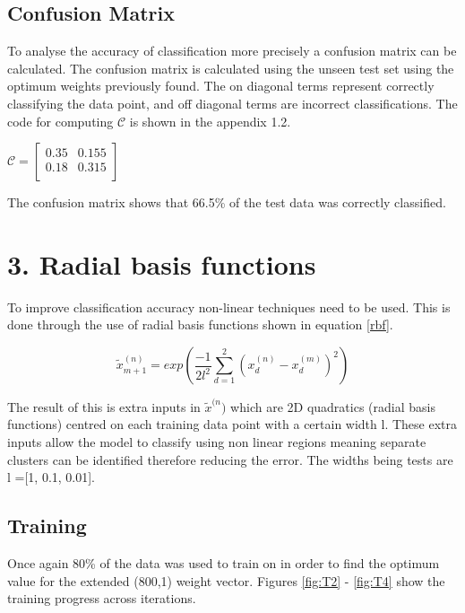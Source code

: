 \documentclass[twoside,twocolumn]{article}
\begin{document}
\subsection{Confusion Matrix}
To analyse the accuracy of classification more precisely a confusion matrix can be calculated. The confusion matrix is calculated using the unseen test set using the optimum weights previously found. The on diagonal terms represent correctly classifying the data point, and off diagonal terms are incorrect classifications. The code for computing $\mathcal{C}$ is shown in the appendix 1.2.

\begin{center}
$\mathcal{C}=  
\begin{bmatrix}
    0.35 & 0.155  \\
    0.18 & 0.315 \\
\end{bmatrix}$

\end{center}

The confusion matrix shows that 66.5\% of the test data was correctly classified.


\section{3. Radial basis functions}
To improve classification accuracy non-linear techniques need to be used. This is done through the use of radial basis functions shown in equation \ref{rbf}.

\begin{equation}
\label{rbf}
\tilde{x}_{m+1}^{(n)} = exp (\frac{-1}{2l^2}\sum^2_{d=1} (x_d^{(n)} - x_d^{(m)})^2)
\end{equation}

 The result of this is extra inputs in $\tilde{x}^{(n})$ which are 2D quadratics (radial basis functions) centred on each training data point with a certain width l. These extra inputs allow the model to classify using non linear regions meaning separate clusters can be identified therefore reducing the error. The widths being tests are l =[1, 0.1, 0.01].
\subsection{Training}
Once again 80\% of the data was used to train on in order to find the optimum value for the extended (800,1) weight vector. Figures \ref{fig:T2} - \ref{fig:T4} show the training progress across iterations. 
\end{document}

